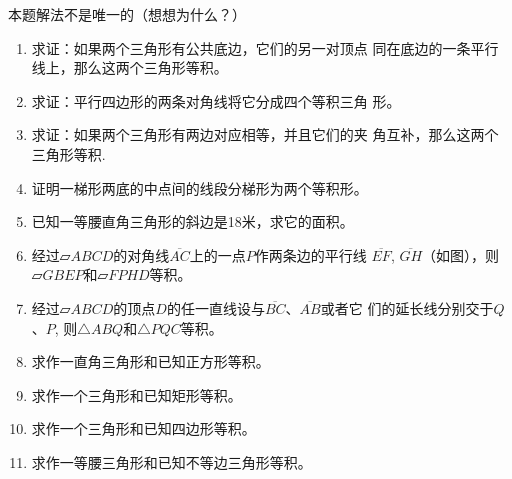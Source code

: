 \begin{rmk}
    本题解法不是唯一的（想想为什么？）
\end{rmk}

\begin{ex}
\begin{enumerate}
    \item 求证：如果两个三角形有公共底边，它们的另一对顶点
    同在底边的一条平行线上，那么这两个三角形等积。
    \item 求证：平行四边形的两条对角线将它分成四个等积三角
    形。
    \item 求证：如果两个三角形有两边对应相等，并且它们的夹
    角互补，那么这两个三角形等积.
    \item 证明一梯形两底的中点间的线段分梯形为两个等积形。
    \item 已知一等腰直角三角形的斜边是18米，求它的面积。
    \item 经过$\parallelogram ABCD$的对角线$\overline{AC}$上的一点$P$作两条边的平行线
    $\overline{EF}$, $\overline{GH}$（如图），则$\parallelogram GBEP$和$\parallelogram FPHD$等积。
    \item 经过$\parallelogram ABCD$的顶点$D$的任一直线设与$\overline{BC}$、$\overline{AB}$或者它
    们的延长线分别交于$Q$、$P$, 则$\triangle ABQ$和$\triangle PQC$等积。
    \item 求作一直角三角形和已知正方形等积。
    \item 求作一个三角形和已知矩形等积。
    \item 求作一个三角形和已知四边形等积。
    \item 求作一等腰三角形和已知不等边三角形等积。
\end{enumerate}
\end{ex}

